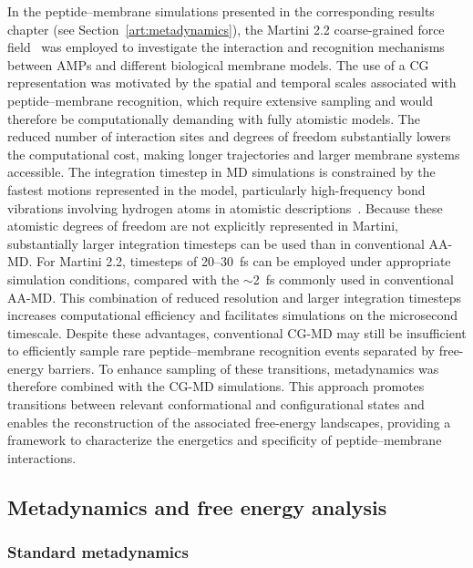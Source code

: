 In the peptide--membrane simulations presented in the corresponding results chapter (see Section~\ref{art:metadynamics}), the Martini 2.2 coarse-grained force field~\cite{martini2} was employed to investigate the interaction and recognition mechanisms between AMPs and different biological membrane models. The use of a CG representation was motivated by the spatial and temporal scales associated with peptide--membrane recognition, which require extensive sampling and would therefore be computationally demanding with fully atomistic models. The reduced number of interaction sites and degrees of freedom substantially lowers the computational cost, making longer trajectories and larger membrane systems accessible.
The integration timestep in MD simulations is constrained by the fastest motions represented in the model, particularly high-frequency bond vibrations involving hydrogen atoms in atomistic descriptions~\cite{Feenstra1999}. Because these atomistic degrees of freedom are not explicitly represented in Martini, substantially larger integration timesteps can be used than in conventional AA-MD. For Martini 2.2, timesteps of 20--30~fs can be employed under appropriate simulation conditions, compared with the $\sim$2~fs commonly used in conventional AA-MD. This combination of reduced resolution and larger integration timesteps increases computational efficiency and facilitates simulations on the microsecond timescale.
Despite these advantages, conventional CG-MD may still be insufficient to efficiently sample rare peptide--membrane recognition events separated by free-energy barriers. To enhance sampling of these transitions, metadynamics was therefore combined with the CG-MD simulations. This approach promotes transitions between relevant conformational and configurational states and enables the reconstruction of the associated free-energy landscapes, providing a framework to characterize the energetics and specificity of peptide--membrane interactions.










\subsection{Metadynamics and free energy analysis}

\subsubsection{Standard metadynamics}

